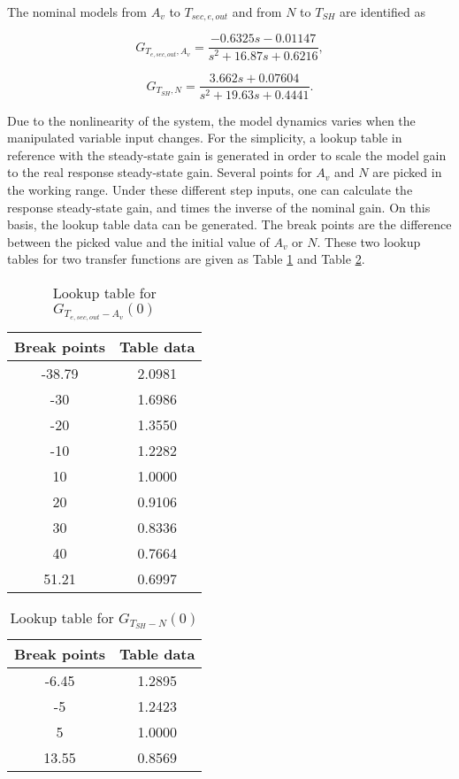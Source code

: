 \documentclass{ifacconf}
\begin{document}
The nominal models from $A_v$ to $T_{sec,e,out}$ and from $N$ to $T_{SH}$ are identified as

\begin{equation}
G_{T_{e,sec,out},A_{v}}=\frac{-0.6325s-0.01147}{s^2+16.87s+0.6216},
\end{equation}

\begin{equation}
G_{T_{SH},N}=\frac{3.662s+0.07604}{s^2+19.63s+0.4441}.
\end{equation}

Due to the nonlinearity of the system, the model dynamics varies when the manipulated variable input changes. For the simplicity, a lookup table in reference with the steady-state gain is generated in order to scale the model gain to the real response steady-state gain. Several points for $A_v$ and $N$ are picked in the working range. Under these different step inputs, one can calculate the response steady-state gain, and times the inverse of the nominal gain. On this basis, the lookup table data can be generated. The break points are the difference between the picked value and the initial value of $A_v$ or $ N$. These two lookup tables for two transfer functions are given as Table \ref{lookup2} and Table \ref{lookup1}.


\begin{table}[hb]
\begin{center}
\caption{Lookup table for $G_{T_{e,sec,out}-A_v}(0)$ }\label{lookup2}
\begin{tabular}{cc}
Break points & Table data \\\hline
-38.79 & 2.0981 \\
-30 & 1.6986 \\
-20 & 1.3550 \\
-10 & 1.2282 \\
10 & 1.0000 \\
20 & 0.9106 \\
30 & 0.8336 \\
40 & 0.7664 \\
51.21 & 0.6997\\ \hline
\end{tabular}
\end{center}
\end{table}


\begin{table}[hb]
\begin{center}
\caption{Lookup table for $G_{T_{SH}-N}(0)$} \label{lookup1}
\begin{tabular}{cc}
Break points & Table data \\\hline
-6.45 & 1.2895 \\
-5 & 1.2423 \\
5 & 1.0000\\
13.55 & 0.8569 \\ \hline
\end{tabular}
\end{center}
\end{table}
\end{document}
